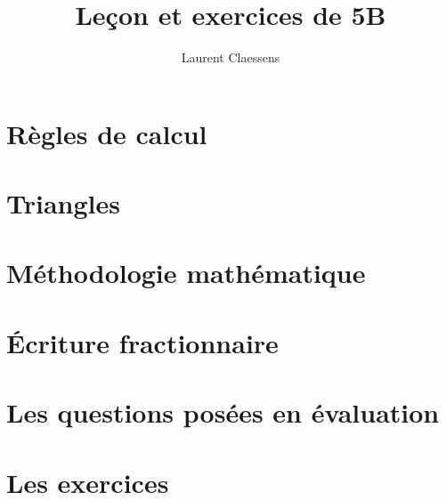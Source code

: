 \documentclass[a4paper,12pt]{book}
\begin{document}

\thispagestyle{empty}

\title{Leçon et exercices de 5B}
\author{Laurent Claessens}
\maketitle

\newpage

\tableofcontents


\chapter{Règles de calcul}


\chapter{Triangles}


\chapter{Méthodologie mathématique}


\chapter{Écriture fractionnaire}


\chapter{Les questions posées en évaluation}


\chapter{Les exercices}




\end{document}
